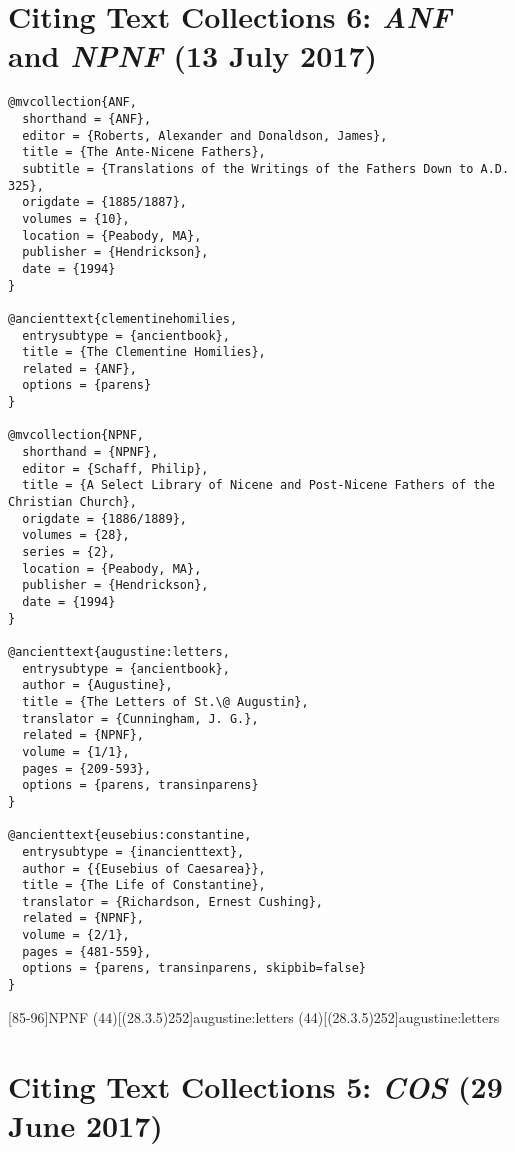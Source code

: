 \documentclass[a4paper]{article}
\begin{document}
\section{Citing Text Collections 6: \emph{ANF} and \emph{NPNF} (13 July 2017)}

\begin{verbatim}
@mvcollection{ANF,
  shorthand = {ANF},
  editor = {Roberts, Alexander and Donaldson, James},
  title = {The Ante-Nicene Fathers},
  subtitle = {Translations of the Writings of the Fathers Down to A.D. 325},
  origdate = {1885/1887},
  volumes = {10},
  location = {Peabody, MA},
  publisher = {Hendrickson},
  date = {1994}
}

@ancienttext{clementinehomilies,
  entrysubtype = {ancientbook},
  title = {The Clementine Homilies},
  related = {ANF},
  options = {parens}
}

@mvcollection{NPNF,
  shorthand = {NPNF},
  editor = {Schaff, Philip},
  title = {A Select Library of Nicene and Post-Nicene Fathers of the Christian Church},
  origdate = {1886/1889},
  volumes = {28},
  series = {2},
  location = {Peabody, MA},
  publisher = {Hendrickson},
  date = {1994}
}

@ancienttext{augustine:letters,
  entrysubtype = {ancientbook},
  author = {Augustine},
  title = {The Letters of St.\@ Augustin},
  translator = {Cunningham, J. G.},
  related = {NPNF},
  volume = {1/1},
  pages = {209-593},
  options = {parens, transinparens}
}

@ancienttext{eusebius:constantine,
  entrysubtype = {inancienttext},
  author = {{Eusebius of Caesarea}},
  title = {The Life of Constantine},
  translator = {Richardson, Ernest Cushing},
  related = {NPNF},
  volume = {2/1},
  pages = {481-559},
  options = {parens, transinparens, skipbib=false}
}
\end{verbatim}

[85-96]{NPNF}
\examplecite(44)[(28.3.5)252]{augustine:letters}
\examplecite[atrans](44)[(28.3.5)252]{augustine:letters}
\begin{verbcite}
  \nocite{ANF, eusebius:constantine}
\end{verbcite}
\exampleabbreviations
\examplebibliography
{}

\section{Citing Text Collections 5: \emph{COS} (29 June 2017)}
\end{document}
